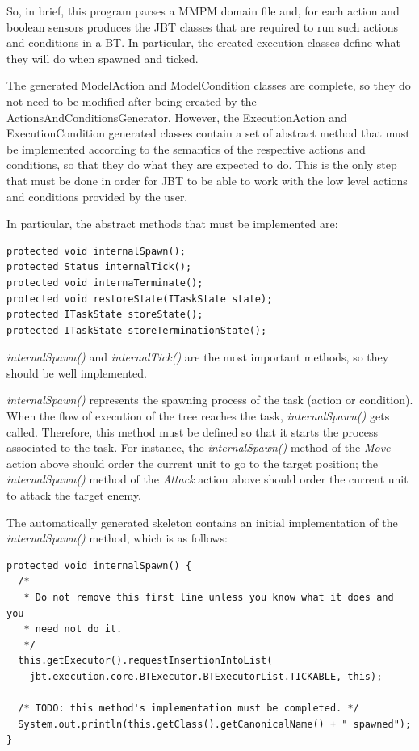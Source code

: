 \documentclass[a4paper]{article}
\begin{document}
So, in brief, this program parses a MMPM domain file and, for each action and boolean sensors produces the JBT classes that are required to run such actions and conditions in a BT. In particular, the created execution classes define what they will do when spawned and ticked.

The generated ModelAction and ModelCondition classes are complete, so they do not need to be modified after being created by the ActionsAndConditionsGenerator. However, the ExecutionAction and ExecutionCondition generated classes contain a set of abstract method that must be implemented according to the semantics of the respective actions and conditions, so that they do what they are expected to do. This is the only step that must be done in order for JBT to be able to work with the low level actions and conditions provided by the user.

In particular, the abstract methods that must be implemented are:

\begin{verbatim}
protected void internalSpawn();
protected Status internalTick();
protected void internaTerminate();
protected void restoreState(ITaskState state);
protected ITaskState storeState();
protected ITaskState storeTerminationState(); 
\end{verbatim}

\textit{internalSpawn()} and \textit{internalTick()} are the most important methods, so they should be well implemented.

\textit{internalSpawn()} represents the spawning process of the task (action or condition). When the flow of execution of the tree reaches the task, \textit{internalSpawn()} gets called. Therefore, this method must be defined so that it starts the process associated to the task. For instance, the \textit{internalSpawn()} method of the \textit{Move} action above should order the current unit to go to the target position; the \textit{internalSpawn()} method of the \textit{Attack} action above should order the current unit to attack the target enemy. 

The automatically generated skeleton contains an initial implementation of the \textit{internalSpawn()} method, which is as follows:

\begin{verbatim}
protected void internalSpawn() {
  /*
   * Do not remove this first line unless you know what it does and you
   * need not do it.
   */
  this.getExecutor().requestInsertionIntoList(
    jbt.execution.core.BTExecutor.BTExecutorList.TICKABLE, this);

  /* TODO: this method's implementation must be completed. */
  System.out.println(this.getClass().getCanonicalName() + " spawned");
}     
\end{verbatim}
\end{document}
